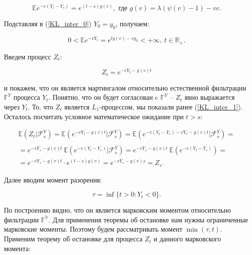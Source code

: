 \documentclass{article}
\theoremstyle{plain}
\theoremstyle{plain}
\theoremstyle{plain}
\theoremstyle{plain}
\theoremstyle{definition}
\theoremstyle{remark}
\begin{document}
\begin{equation}
\label{KL_inter_0}
    \mathbb{E} e^{-v(Y_t - Y_s)} = e^{(t - s)g(v)}, \text{ где } g(v) = \lambda(\psi(v) - 1) - vc.
\end{equation}

Подставляя в (\ref{KL_inter_0}) $Y_0 = y_0$, получаем:

\begin{equation}
\label{KL_inter_1}
    0 < \mathbb{E} e^{-v Y_t} = e^{t g(v) - v y_0} < + \infty,\ t \in \mathbb{R}_+.
\end{equation}


Введем процесс $Z_t$:

\begin{equation}
    Z_t = e^{-v Y_t - g(v) t}
\end{equation}

и покажем, что он является мартингалом относительно естественной фильтрации $\mathbb{F}^Y$ процесса $Y_t$. Понятно, что он будет согласован c $\mathbb{F}^Y$ -- $Z_t$ явно выражается через $Y_t$. То, что $Z_t$ является $L_1$-процессом, мы показали ранее (\ref{KL_inter_1}). Осталось посчитать условное математическое ожидание при $t > s$:

\begin{equation}
\begin{aligned}
    \mathbb{E} (Z_t | \mathcal{F}_s^Y) = \mathbb{E} (e^{-v Y_t - g(v) t} | \mathcal{F}_s^Y) = \mathbb{E} (e^{-v (Y_t - Y_s) - v Y_s - g(v) t} | \mathcal{F}_s^Y) = \\
    \\ = e^{- v Y_s - g(v) t}\ \mathbb{E} (e^{-v (Y_t - Y_s)} | \mathcal{F}_s^Y) = e^{- v Y_s - g(v) t}\ \mathbb{E} (e^{-v (Y_t - Y_s)}) = \\
    = e^{- v Y_s - g(v) t} \cdot e^{(t - s)g(v)} = e^{-v Y_s - g(v) s} = Z_s.
\end{aligned}
\end{equation}

Далее вводим момент разорения:

\begin{equation}
    \tau = \inf \{ t > 0 : Y_t < 0 \}.
\end{equation}

По построению видно, что он является марковским моментом относительно фильтрации $\mathbb{F^Y}$. Для применения теоремы об остановке нам нужны ограниченные марковские моменты. Поэтому будем рассматривать момент $\min (\tau, t)$. Применим теорему об остановке для процесса $Z_t$ и данного марковского момента:
\end{document}
